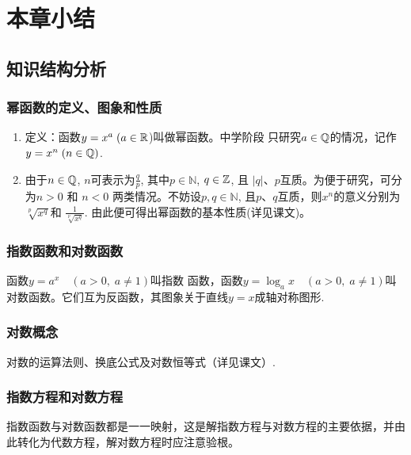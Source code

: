 \section{本章小结}

\subsection{知识结构分析}

\subsubsection{幂函数的定义、图象和性质}

\begin{enumerate}
    \item 定义：函数$y=x^a\; (a\in \mathbb{R}$)叫做幂函数。中学阶段
只研究$a\in \mathbb{Q}$的情况，记作$y= x^n\; ( n \in \mathbb{Q})$.
\item 由于$n\in \mathbb{Q}$, $n$可表示为$\frac qp$, 其中$p\in\mathbb{N}$, $q\in \mathbb{Z}$, 且
$|q|$、$p$互质。为便于研究，可分为$n>0$ 和 $n<0$ 两类情况。不妨设$p, q\in\mathbb{N}$, 且$p$、$q$互质，则$x^{n}$的意义分别为$\sqrt[p]{x^{q}}$和
$\frac{1}{\sqrt[p]{x^q}}$. 由此便可得出幂函数的基本性质(详见课文)。
\end{enumerate}

\subsubsection{指数函数和对数函数}

函数$y= a^x\quad ( a> 0,\;  a\neq1) $叫指数 函数，函数$y=\log_{a}x\quad (a>0,\; a\neq1)$叫对数函数。它们互为反函数，其图象关于直线$y=x$成轴对称图形.

\subsubsection{对数概念}
对数的运算法则、换底公式及对数恒等式（详见课文）.

\subsubsection{指数方程和对数方程}
指数函数与对数函数都是一一映射，这是解指数方程与对数方程的主要依据，并由此转化为代数方程，解对数方程时应注意验根。

